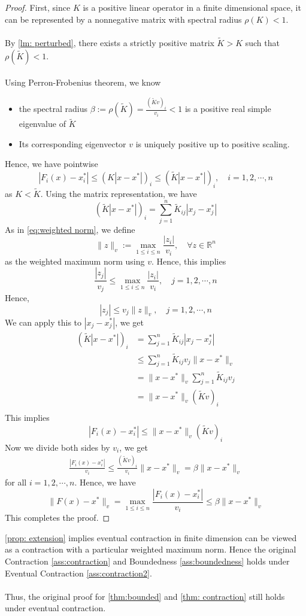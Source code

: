 \begin{proof}
    First, since $K$ is a positive linear operator in a finite dimensional space, it can be represented by a nonnegative matrix with spectral radius $\rho(K)<1$.\\
    \\
    By \autoref{lm: perturbed}, there exists a strictly positive matrix $\tilde K>K$ such that $\rho(\tilde K)<1$.\\
    \\
    Using Perron-Frobenius theorem, we know
    \begin{itemize}
        \item the spectral radius $\beta:=\rho(\tilde K) =\frac{(\tilde Kv)_i}{v_i}<1 $ is a positive real simple eigenvalue of $\tilde K$
        \item Its corresponding eigenvector $v$ is uniquely positive up to positive scaling. 
    \end{itemize}
    Hence, we have pointwise 
    $$
    |F_i(x)-x^*_i|\le (K|x-x^*|)_i \le (\tilde K|x-x^*|)_i,\quad i=1,2,\cdots, n
    $$
    as $K<\tilde K$. Using the matrix representation, we have
    $$
    (\tilde K|x-x^*|)_i= \sum_{j=1}^n \tilde K_{ij}|x_j-x_j^*|
    $$
    As in \autoref{eq:weighted norm}, we define
    $$
    \|z\|_v:=\max_{1\le i\le n}\frac{|z_i|}{v_i},\quad \forall z\in \mathbb{R}^n
    $$
    as the weighted maximum norm using $v$. Hence, this implies
    $$
    \frac{|z_j|}{v_j}\le \max_{1\le i\le n}\frac{|z_i|}{v_i},\quad j=1,2,\cdots,n
    $$
    Hence,
    $$
    |z_j|\le v_j\|z\|_v,\quad j=1,2,\cdots,n
    $$
    We can apply this to $|x_j-x_j^*|$, we get
    \begin{align*}
        (\tilde K|x-x^*|)_i &= \sum_{j=1}^n \tilde K_{ij}|x_j-x_j^*|\\
        &\le \sum_{j=1}^n \tilde K_{ij} v_j\|x-x^*\|_v\\
        &= \|x-x^*\|_v\sum_{j=1}^n \tilde K_{ij}v_j\\
        &= \|x-x^*\|_v(\tilde Kv)_i\\
    \end{align*}
    This implies
    $$
    |F_i(x)-x^*_i|\le\|x-x^*\|_v(\tilde Kv)_i
    $$
    Now we divide both sides by $v_i$, we get
    \begin{align*}
        \frac{|F_i(x)-x^*_i|}{v_i}\le \frac{(\tilde Kv)_i}{v_i} \|x-x^*\|_v= \beta \|x-x^*\|_v
    \end{align*}
    for all $i=1,2,\cdots, n$. Hence, we have
    $$
    \|F(x)-x^*\|_v = \max_{1\le i \le n}\frac{|F_i(x)-x^*_i|}{v_i} \le\beta \|x-x^*\|_v
    $$
    This completes the proof.
\end{proof}
\begin{remark}
    \autoref{prop: extension} implies eventual contraction in finite dimension can be viewed as a contraction with a particular weighted maximum norm. Hence the original Contraction \autoref{ass:contraction} and Boundedness \autoref{ass:boundedness} holds under Eventual Contraction \autoref{ass:contraction2}.\\
    \\
    Thus, the original proof for \autoref{thm:bounded} and \autoref{thm: contraction} still holds under eventual contraction.
\end{remark}